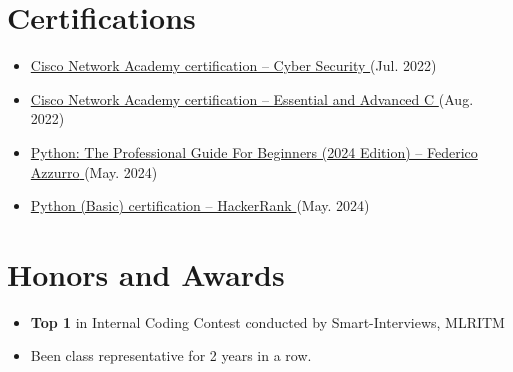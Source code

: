 \documentclass[a4paper,11pt]{article}
\newcommand{\resumeItem}[1]{
  \item\small{
    {#1 \vspace{-2pt}}
  }
}
\newcommand{\resumeItemListStart}{\begin{itemize}}
\newcommand{\resumeItemListEnd}{\end{itemize}\vspace{-5pt}}
\begin{document}
  \section{Certifications}
    \resumeItemListStart[parsep = 0pt]
      \resumeItem{\href{https://drive.google.com/file/d/1pywMAJxX-Mg6qSX5HHIW5wEbV3PR07LQ/view?usp=drive_link}
                        {Cisco Network Academy certification -- Cyber Security \faExternalLink*} (Jul. 2022)}
      \resumeItem{\href{https://drive.google.com/file/d/1w72XSRwblf5AqqEBGvnUbvUayJTcpWO-/view?usp=drive_link}
                        {Cisco Network Academy certification -- Essential and Advanced C \faExternalLink*} (Aug. 2022)}
      \resumeItem{\href{https://www.udemy.com/certificate/UC-79138624-8361-423b-b131-42765a08db12/}
                        {Python: The Professional Guide For Beginners (2024 Edition) -- \href{https://www.linkedin.com/in/federicoazzu/}{Federico Azzurro} \faExternalLink*} (May. 2024)}
      \resumeItem{\href{https://www.hackerrank.com/certificates/607a2d4d88f1}
                        {Python (Basic) certification -- HackerRank \faExternalLink*} (May. 2024)}
    \resumeItemListEnd

  
\vspace{-11pt}
\section{Honors and Awards}
  \resumeItemListStart[parsep = -2pt]
    \resumeItem{\textbf{Top 1} in Internal Coding Contest conducted by Smart-Interviews, MLRITM}
    \resumeItem{Been class representative for 2 years in a row.}
  \resumeItemListEnd

\end{document}
